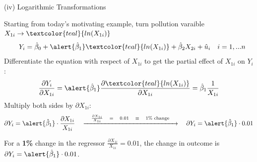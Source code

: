 \documentclass[11pt, aspectratio = 169]{beamer}
\begin{document}


\begin{frame}[fragile]{(iv) Logarithmic Transformations}

Starting from today's motivating example, turn pollution varaible $X_{1i}  \rightarrow \textcolor{teal}{ln (X_{1i})}$
\[
\quad Y_i = \hat{\beta}_0 + \alert{\hat{\beta}_1} \textcolor{teal}{ln(X_{1i})} + \hat{\beta}_2 X_{2i} + \hat{u}_{i} \quad i = 1, ... n
\]
\pause
Differentiate the equation with respect of $X_{1i}$ to get the partial effect of $X_{1i}$ on $Y_i$:
\begin{align*}
    \frac{\partial Y_i}{\partial X_{1i}} = \alert{\hat{\beta}_1} \frac{\partial \textcolor{teal}{ln(X_{1i})}}{\partial X_{1i}} =
    \hat{\beta}_1 \frac{1}{X_{1i}}
\end{align*}
\pause
Multiply both sides by $\partial X_{1i}$:
\begin{align*}
    \partial Y_i = \alert{\hat{\beta}_1} \cdot \frac{\partial X_{1i}}{X_{1i}} 
    \quad \xrightarrow{\quad \frac{\partial X_{1i}}{X_{1i}} \quad= \quad 0.01 \quad \equiv \quad 1\% \text{ change} \quad} \quad
     \partial Y_i = \alert{\hat{\beta}_1} \cdot 0.01
\end{align*}

For a \textbf{1\%} change in the regressor $\frac{\partial X_{1i}}{X_{1i}} = 0.01$, the change in outcome is $\partial Y_i = \alert{{\hat{\beta}}_1} \cdot 0.01$.

\end{frame}
\end{document}
